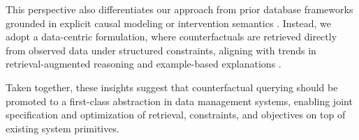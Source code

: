 This perspective also differentiates our approach from prior database frameworks grounded in explicit causal modeling or intervention semantics \cite{pachera2025whatif}. Instead, we adopt a data-centric formulation, where counterfactuals are retrieved directly from observed data under structured constraints, aligning with trends in retrieval-augmented reasoning \cite{lewis2020retrieval} and example-based explanations \cite{schultheis2023overview}.

Taken together, these insights suggest that counterfactual querying should be promoted to a first-class abstraction in data management systems, enabling joint specification and optimization of retrieval, constraints, and objectives on top of existing system primitives.